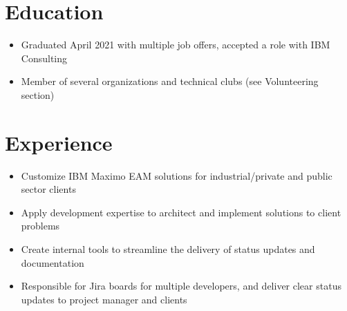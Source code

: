 \documentclass[]{rcf_cv}
\begin{document}
	
	

	\section{Education}
	
		\begin{itemize}
			\setlength\itemsep{-0.4em}
			\renewcommand\labelitemi{--}
			
			\item Graduated April 2021 with multiple job offers, accepted a role with IBM Consulting
			\item Member of several organizations and technical clubs (see Volunteering section)
					
			
			
		\end{itemize}
	
	\section{Experience}
	
	\begin{itemize}
		\setlength\itemsep{-0.4em}
		\renewcommand\labelitemi{--}
		
		\item Customize IBM Maximo EAM solutions for industrial/private and public sector clients
		\item Apply development expertise to architect and implement solutions to client problems
		\item Create internal tools to streamline the delivery of status updates and documentation
		\item Responsible for Jira boards for multiple developers, and deliver clear status updates to project manager and clients
		
	\end{itemize}
	
\end{document}
